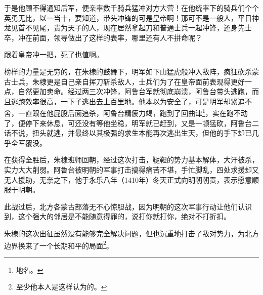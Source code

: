 \begin{multicols}{\theparacolNo}
于是他顾不得通知后军，便亲率数千骑兵猛冲对方大营！在他统率下的骑兵们个个英勇无比，以一当十，要知道，带头冲锋的可是皇帝啊！那可不是一般人，平日神龙见首不见尾，贵为天子的人，现在居然拿起刀和普通士兵一起冲锋，还身先士卒，冲在前面，领导做出了这样的表率，哪里还有人不拼命呢？

跟着皇帝冲一把，死了也值啊。

榜样的力量是无穷的，在朱棣的鼓舞下，明军如下山猛虎般冲入敌阵，疯狂砍杀蒙古士兵，朱棣更是自己亲自挥刀斩杀敌人，士兵们为了在皇帝面前表现得更好一点，自然更加卖命。经过两三次冲锋，阿鲁台军就彻底崩溃，阿鲁台带头逃跑，而且逃跑效率很高，一下子逃出去上百里地。他本以为安全了，可是明军却紧追不舍，一直跟在他屁股后面追杀，阿鲁台精疲力竭，跑到了回曲津\footnote{地名。}，实在跑不动了，便停下来休息，可还没有等他坐稳，明军就已赶到，又是一顿猛砍，阿鲁台二话不说，扭头就逃，并最终以其极强的求生本能再次逃出生天，但他的手下却已几乎全军覆没。

在获得全胜后，朱棣班师回朝，经过这次打击，鞑靼的势力基本解体，大汗被杀，实力大大削弱。阿鲁台被明朝的军事打击搞得痛苦不堪，手忙脚乱，四处求援却又无人援助，无奈之下，他于永乐八年（1410年）冬天正式向明朝朝贡，表示愿意顺服于明朝。

此战过后，北方各蒙古部落无不心惊胆战，因为明朝的这次军事行动让他们认识到，这个强大的邻居是不能随意得罪的，说打你就打你，绝对不打折扣。

朱棣的这次出征虽然没有能够完全解决问题，但也沉重地打击了敌对势力，为北方边界换来了一个长期和平的局面\footnote{至少他本人是这样认为的。}。
\ifnum{}
	\end{multicols}
\fi
\newpage
